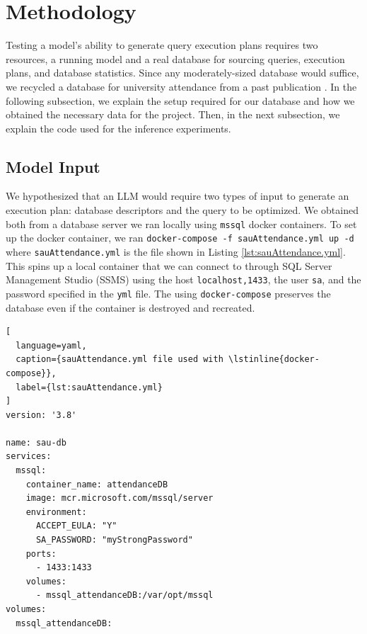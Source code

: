 \section{Methodology}
Testing a model's ability to generate query execution plans requires two resources, a running model and a real database for sourcing queries, execution plans, and database statistics. Since any moderately-sized database would suffice, we recycled a database for university attendance from a past publication \cite{hybl2023}. In the following subsection, we explain the setup required for our database and how we obtained the necessary data for the project. Then, in the next subsection, we explain the code used for the inference experiments.

\subsection{Model Input}
We hypothesized that an LLM would require two types of input to generate an execution plan: database descriptors and the query to be optimized. We obtained both from a database server we ran locally using \lstinline{mssql} docker containers. To set up the docker container, we ran \lstinline{docker-compose -f sauAttendance.yml up -d} where \lstinline{sauAttendance.yml} is the file shown in Listing \ref{lst:sauAttendance.yml}. This spins up a local container that we can connect to through SQL Server Management Studio (SSMS) using the host \lstinline{localhost,1433}, the user \lstinline{sa}, and the password specified in the \lstinline{yml} file. The using \lstinline{docker-compose} preserves the database even if the container is destroyed and recreated.

\begin{lstlisting}[
  language=yaml,
  caption={sauAttendance.yml file used with \lstinline{docker-compose}},
  label={lst:sauAttendance.yml}
]
version: '3.8'

name: sau-db
services:
  mssql:
    container_name: attendanceDB
    image: mcr.microsoft.com/mssql/server
    environment:
      ACCEPT_EULA: "Y"
      SA_PASSWORD: "myStrongPassword"
    ports:
      - 1433:1433
    volumes:
      - mssql_attendanceDB:/var/opt/mssql
volumes:
  mssql_attendanceDB:
\end{lstlisting}

